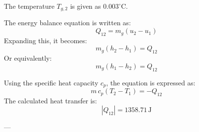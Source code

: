 The temperature \( T_{g,2} \) is given as \( 0.003^\circ\text{C} \).  

The energy balance equation is written as:  
\[
Q_{12} = m_g (u_2 - u_1)
\]  
Expanding this, it becomes:  
\[
m_g (h_2 - h_1) = Q_{12}
\]  
Or equivalently:  
\[
m_g (h_1 - h_2) = Q_{12}
\]  

Using the specific heat capacity \( c_p \), the equation is expressed as:  
\[
m \, c_p (T_2 - T_1) = -Q_{12}
\]  
The calculated heat transfer is:  
\[
|Q_{12}| = 1358.71 \, \text{J}
\]  

---
